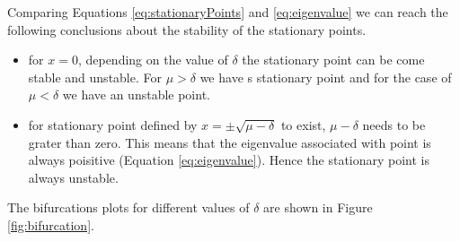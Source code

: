 Comparing Equations \eqref{eq:stationaryPoints} and \eqref{eq:eigenvalue} we can reach the following conclusions about the stability of the stationary points.

\begin{itemize}
	\item for $x = 0$, depending on the value of $\delta$ the stationary point can be come stable and unstable. For $\mu > \delta$ we have s stationary point and for the case of $\mu < \delta$ we have an unstable point.
	\item for stationary point defined by $x = \pm \sqrt{\mu - \delta}$ to exist, $\mu - \delta$ needs to be grater than zero. This means that the eigenvalue associated with point is always poisitive (Equation \eqref{eq:eigenvalue}). Hence the stationary point is always unstable.
\end{itemize}

The bifurcations plots for different values of $\delta$ are shown in Figure \ref{fig:bifurcation}.

